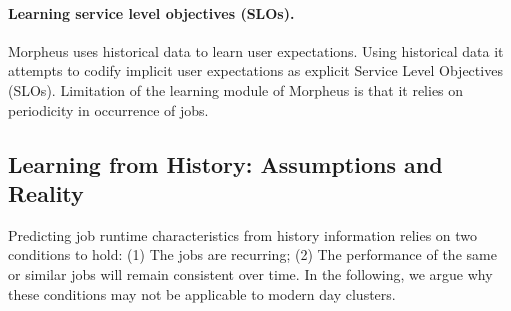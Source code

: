 \paragraph{Learning service level objectives (SLOs).} Morpheus \cite{morpheus}
uses historical data to learn user expectations. Using historical data it
attempts to codify implicit user expectations as explicit Service Level
Objectives (SLOs). Limitation of the learning module of Morpheus is that it
relies on periodicity in occurrence of jobs.
\fi




\subsection{Learning from History: Assumptions and Reality}
\label{sec:back:whatsWrong}

Predicting job runtime characteristics from history information relies on two
conditions to hold: (1) The jobs are recurring; (2) The performance of
the same {or similar} jobs
will remain consistent over time.  In the following, we argue why these
conditions may not be applicable to modern day clusters.



